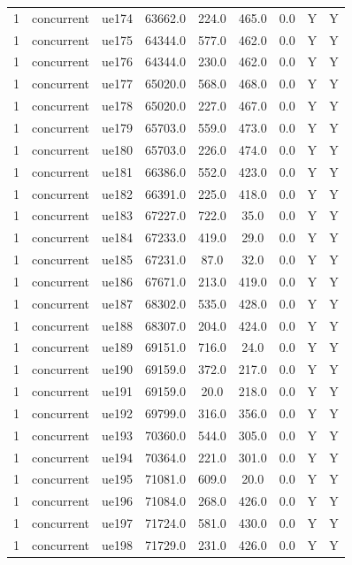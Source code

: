 \begin{table}[ht]
\begin{tabular}{|c|c|c|c|c|c|c|c|c|}
1 & concurrent & ue174 & 63662.0 & 224.0 & 465.0 & 0.0 & Y & Y \\
1 & concurrent & ue175 & 64344.0 & 577.0 & 462.0 & 0.0 & Y & Y \\
1 & concurrent & ue176 & 64344.0 & 230.0 & 462.0 & 0.0 & Y & Y \\
1 & concurrent & ue177 & 65020.0 & 568.0 & 468.0 & 0.0 & Y & Y \\
1 & concurrent & ue178 & 65020.0 & 227.0 & 467.0 & 0.0 & Y & Y \\
1 & concurrent & ue179 & 65703.0 & 559.0 & 473.0 & 0.0 & Y & Y \\
1 & concurrent & ue180 & 65703.0 & 226.0 & 474.0 & 0.0 & Y & Y \\
1 & concurrent & ue181 & 66386.0 & 552.0 & 423.0 & 0.0 & Y & Y \\
1 & concurrent & ue182 & 66391.0 & 225.0 & 418.0 & 0.0 & Y & Y \\
1 & concurrent & ue183 & 67227.0 & 722.0 & 35.0 & 0.0 & Y & Y \\
1 & concurrent & ue184 & 67233.0 & 419.0 & 29.0 & 0.0 & Y & Y \\
1 & concurrent & ue185 & 67231.0 & 87.0 & 32.0 & 0.0 & Y & Y \\
1 & concurrent & ue186 & 67671.0 & 213.0 & 419.0 & 0.0 & Y & Y \\
1 & concurrent & ue187 & 68302.0 & 535.0 & 428.0 & 0.0 & Y & Y \\
1 & concurrent & ue188 & 68307.0 & 204.0 & 424.0 & 0.0 & Y & Y \\
1 & concurrent & ue189 & 69151.0 & 716.0 & 24.0 & 0.0 & Y & Y \\
1 & concurrent & ue190 & 69159.0 & 372.0 & 217.0 & 0.0 & Y & Y \\
1 & concurrent & ue191 & 69159.0 & 20.0 & 218.0 & 0.0 & Y & Y \\
1 & concurrent & ue192 & 69799.0 & 316.0 & 356.0 & 0.0 & Y & Y \\
1 & concurrent & ue193 & 70360.0 & 544.0 & 305.0 & 0.0 & Y & Y \\
1 & concurrent & ue194 & 70364.0 & 221.0 & 301.0 & 0.0 & Y & Y \\
1 & concurrent & ue195 & 71081.0 & 609.0 & 20.0 & 0.0 & Y & Y \\
1 & concurrent & ue196 & 71084.0 & 268.0 & 426.0 & 0.0 & Y & Y \\
1 & concurrent & ue197 & 71724.0 & 581.0 & 430.0 & 0.0 & Y & Y \\
1 & concurrent & ue198 & 71729.0 & 231.0 & 426.0 & 0.0 & Y & Y \\

\end{tabular}
\end{table}
